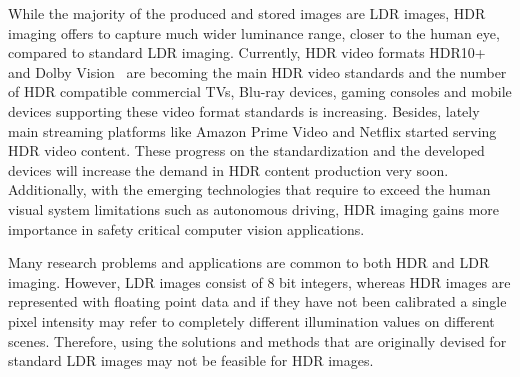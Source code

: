 While the majority of the produced and stored images are LDR images, HDR imaging offers to capture much wider luminance range, closer to the human eye, compared to standard LDR imaging. Currently, HDR video formats HDR10+~\cite{HDR10+} and Dolby Vision~\cite{chinnock2016dolby} are becoming the main HDR video standards and the number of HDR compatible commercial TVs, Blu-ray devices, gaming consoles and mobile devices supporting these video format standards is increasing. Besides, lately main streaming platforms like Amazon Prime Video and Netflix started serving HDR video content. These progress on the standardization and the developed devices will increase the demand in HDR content production very soon. Additionally, with the emerging technologies that require to exceed the human visual system limitations such as autonomous driving, HDR imaging gains more importance in safety critical computer vision applications.


Many research problems and applications are common to both HDR and LDR imaging. However, LDR images consist of 8 bit integers, whereas HDR images are represented with floating point data and if they have not been calibrated a single pixel intensity may refer to completely different illumination values on different scenes. Therefore, using the solutions and methods that are originally devised for standard LDR images may not be feasible for HDR images. 


